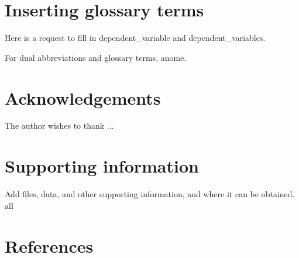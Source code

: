 \documentclass[10pt, letterpaper, twoside]{article}
\begin{document}
\section{Inserting glossary terms}\label{sec:glossary_terms}

Here is a request to fill in \gls{dependent_variable} and \glspl{dependent_variable}.

For dual abbreviations and glossary terms, \gls{anome}.



\newpage
\section{Acknowledgements}\label{sec:acknowledgements}

The author wishes to thank ...

\section{Supporting information}\label{sec:supporting_information}

Add files, data, and other supporting information, and where it can be obtained.
all

\newpage
\printunsrtglossary[type={abbreviations}]

\newpage
\printunsrtglossary[style={indexgroup}]

\newpage
\section{References}\label{sec:references}
\nocite{*}
\printbibliography[heading=none]
\end{document}

